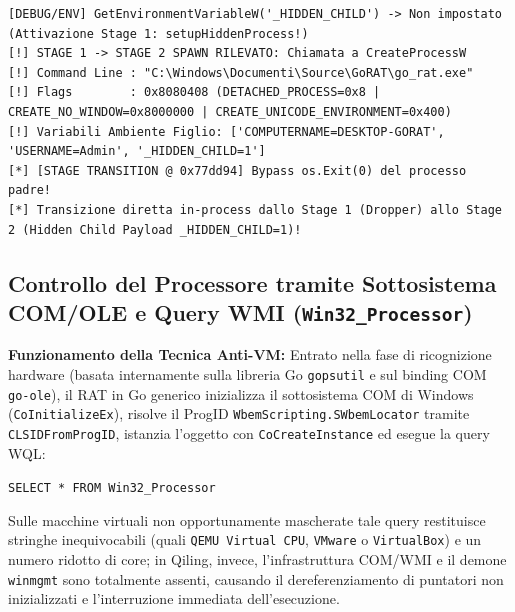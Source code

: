 \documentclass[11pt, a4paper]{article}
\begin{document}
\noindent\begin{minipage}{\linewidth}
\begin{lstlisting}[style=consoleout, caption={Output dell'intercettazione di \_HIDDEN\_CHILD e della transizione in-process dallo Stadio 1 allo Stadio 2.}, label={lst:gorat_stage1_out}]
[DEBUG/ENV] GetEnvironmentVariableW('_HIDDEN_CHILD') -> Non impostato (Attivazione Stage 1: setupHiddenProcess!)
[!] STAGE 1 -> STAGE 2 SPAWN RILEVATO: Chiamata a CreateProcessW
[!] Command Line : "C:\Windows\Documenti\Source\GoRAT\go_rat.exe"
[!] Flags        : 0x8080408 (DETACHED_PROCESS=0x8 | CREATE_NO_WINDOW=0x8000000 | CREATE_UNICODE_ENVIRONMENT=0x400)
[!] Variabili Ambiente Figlio: ['COMPUTERNAME=DESKTOP-GORAT', 'USERNAME=Admin', '_HIDDEN_CHILD=1']
[*] [STAGE TRANSITION @ 0x77dd94] Bypass os.Exit(0) del processo padre!
[*] Transizione diretta in-process dallo Stage 1 (Dropper) allo Stage 2 (Hidden Child Payload _HIDDEN_CHILD=1)!
\end{lstlisting}
\end{minipage}


\subsection[Controllo del Processore tramite COM/OLE e Query WMI]{Controllo del Processore tramite Sottosistema COM/OLE e Query WMI (\texorpdfstring{\texttt{Win32\_\allowbreak{}Processor}}{Win32\_Processor})}

\textbf{Funzionamento della Tecnica Anti-VM:} Entrato nella fase di ricognizione hardware (basata internamente sulla libreria Go \texttt{gopsutil} e sul binding COM \texttt{go-ole}), il RAT in Go generico inizializza il sottosistema COM di Windows (\texttt{Co\allowbreak{}Initialize\allowbreak{}Ex}), risolve il ProgID \texttt{Wbem\allowbreak{}Scripting.\allowbreak{}SWbem\allowbreak{}Locator} tramite \texttt{CLSID\allowbreak{}From\allowbreak{}ProgID}, istanzia l'oggetto con \texttt{Co\allowbreak{}Create\allowbreak{}Instance} ed esegue la query WQL:
\begin{center}
	\texttt{SELECT * FROM Win32\_\allowbreak{}Processor}
\end{center}
Sulle macchine virtuali non opportunamente mascherate tale query restituisce stringhe inequivocabili (quali \texttt{QEMU Virtual CPU}, \texttt{VMware} o \texttt{VirtualBox}) e un numero ridotto di core; in Qiling, invece, l'infrastruttura COM/WMI e il demone \texttt{winmgmt} sono totalmente assenti, causando il dereferenziamento di puntatori non inizializzati e l'interruzione immediata dell'esecuzione.
\end{document}
